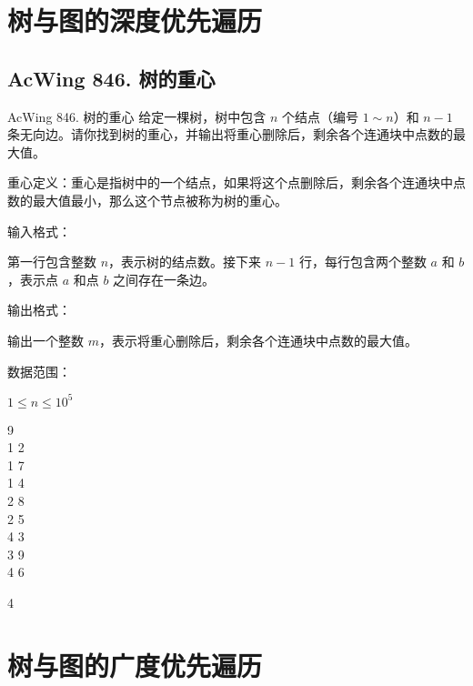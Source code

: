 \section{树与图的深度优先遍历}

\subsection{AcWing 846. 树的重心}
\begin{titledbox}{AcWing 846. 树的重心}
    给定一棵树，树中包含 $n$ 个结点（编号 $1 \sim n$）和 $n-1$ 条无向边。请你找到树的重心，并输出将重心删除后，剩余各个连通块中点数的最大值。

    重心定义：重心是指树中的一个结点，如果将这个点删除后，剩余各个连通块中点数的最大值最小，那么这个节点被称为树的重心。

    输入格式：

    第一行包含整数 $n$，表示树的结点数。接下来 $n-1$ 行，每行包含两个整数 $a$ 和 $b$，表示点 $a$ 和点 $b$ 之间存在一条边。

    输出格式：

    输出一个整数 $m$，表示将重心删除后，剩余各个连通块中点数的最大值。

    数据范围：

    $1 \le n \le 10^5$

    \begin{inputblock}
        9 \\
        1 2 \\
        1 7 \\
        1 4 \\
        2 8 \\
        2 5 \\
        4 3 \\
        3 9 \\
        4 6
    \end{inputblock}
    \begin{outputblock}
        4
    \end{outputblock}
\end{titledbox}


\section{树与图的广度优先遍历}


